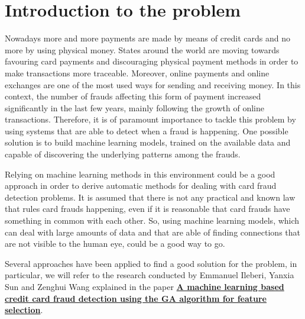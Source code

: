 \documentclass{Configuration_Files/PoliMi3i_thesis}
\begin{document}

\lstset{language=SQL, style=mystyle}


\chapter{Introduction to the problem}
Nowadays more and more payments are made by means of credit cards and no more by using physical money. States around the world are moving towards favouring card payments and discouraging physical payment methods in order to make transactions more traceable. Moreover, online payments and online exchanges are one of the most used ways for sending and receiving money. In this context, the number of frauds affecting this form of payment increased significantly in the last few years, mainly following the growth of online transactions. Therefore, it is of paramount importance to tackle this problem by using systems that are able to detect when a fraud is happening.
One possible solution is to build machine learning models, trained on the available data and capable of discovering the underlying patterns among the frauds.

Relying on machine learning methods in this environment could be a good approach in order to derive automatic methods for dealing with card fraud detection problems.
It is assumed that there is not any practical and known law that rules card frauds happening, even if it is reasonable that card frauds have something in common with each other. So, using machine learning models, which can deal with large amounts of data and that are able of finding connections that are not visible to the human eye, could be a good way to go.

Several approaches have been applied to find a good solution for the problem, in particular, we will refer to the research conducted by Emmanuel Ileberi, Yanxia Sun and Zenghui Wang
explained in the paper \href{https://journalofbigdata.springeropen.com/articles/10.1186/s40537-022-00573-8}{\textbf{A machine learning based credit card fraud detection using the GA algorithm for feature selection}}.
\end{document}

